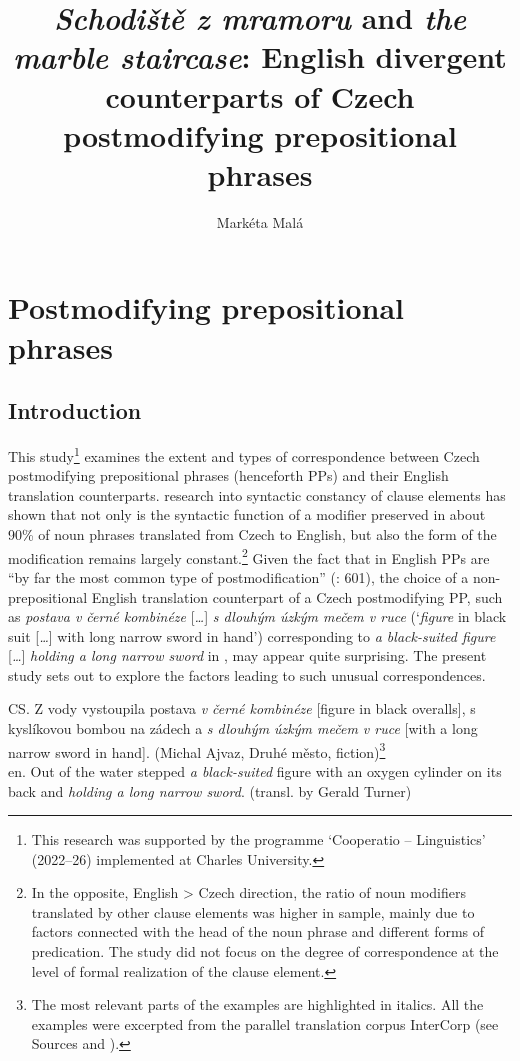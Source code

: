 \documentclass[output=paper]{langscibook}
\author{Markéta Malá\orcid{}\affiliation{Charles University}}
\title[\emph{Schodiště z mramoru} and \emph{the marble staircase}]{\emph{Schodiště z mramoru} and \emph{the marble staircase}: English divergent counterparts of Czech postmodifying prepositional phrases}
\begin{document}
\maketitle

\section{Postmodifying prepositional phrases}

\subsection{Introduction}

This study\footnote{This research was supported by the programme ‘Cooperatio – Linguistics’ (2022–26) implemented at Charles University.} examines the extent and types of correspondence between Czech postmodifying prepositional phrases (henceforth PPs) and their English translation counterparts.  research into syntactic constancy of clause elements has shown that not only is the syntactic function of a modifier preserved in about 90\% of noun phrases translated from Czech to English, but also the form of the modification remains largely constant.\footnote{In the opposite, English > Czech direction, the ratio of noun modifiers translated by other clause elements was higher in  sample, mainly due to factors connected with the head of the noun phrase and different forms of predication. The study did not focus on the degree of correspondence at the level of formal realization of the clause element.} Given the fact that in English PPs are “by far the most common type of postmodification” (\citealt{BiberEtAl2021}: 601), the choice of a non-prepositional English translation counterpart of a Czech postmodifying PP, such as \textit{postava v černé kombinéze} [\textit{…}] \textit{s dlouhým úzkým mečem v ruce} (‘\textit{figure} in black suit [\textit{…}] with long narrow sword in hand’) corresponding to \textit{a black-suited figure} [\textit{…}] \textit{holding a long narrow sword} in , may appear quite surprising. The present study sets out to explore the factors leading to such unusual correspondences.

\ea\label{ex:mala:1} CS. Z vody vystoupila postava \textit{v černé kombinéze} [figure in black overalls], s kyslíkovou bombou na zádech a \textit{s dlouhým úzkým mečem v ruce} [with a long narrow sword in hand]. (Michal Ajvaz, Druhé město, fiction)\footnote{The most relevant parts of the examples are highlighted in italics. All the examples were excerpted from the parallel translation corpus InterCorp (see Sources and ).}\\
en. Out of the water stepped \textit{a black-suited} figure with an oxygen cylinder on its back and \textit{holding a long narrow sword}. (transl. by Gerald Turner)
\z
\end{document}
